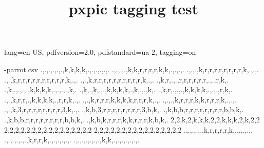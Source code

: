 \DocumentMetadata
  {
    lang=en-US,
    pdfversion=2.0,
    pdfstandard=ua-2,
    tagging=on
  }
\begin{filecontents*}[overwrite]{\jobname-parrot.csv}
.,.,.,.,.,.,k,k,k,k,.,.,.,.,.,.
.,.,.,.,k,k,r,r,r,r,k,k,.,.,.,.
.,.,.,k,r,r,r,r,r,r,r,r,k,.,.,.
.,.,k,r,r,r,r,r,r,r,r,r,r,k,.,.
.,.,k,r,r,r,r,r,r,r,r,r,r,k,.,.
.,k,r,.,.,r,r,r,r,r,r,.,.,r,k,.
.,k,.,.,.,.,k,k,k,k,.,.,.,.,k,.
.,k,.,k,.,.,k,k,k,k,.,k,.,.,k,.
.,k,r,.,.,.,k,k,k,k,.,.,.,r,k,.
.,.,k,r,r,.,k,k,k,k,.,r,r,k,.,.
.,.,k,r,r,r,k,k,k,k,r,r,r,k,.,.
.,.,.,k,r,r,r,k,k,r,r,r,k,.,.,.
.,.,k,3,r,r,r,r,r,r,r,r,3,k,.,.
.,k,b,3,r,r,r,r,r,r,r,r,3,b,k,.
.,k,b,b,r,r,r,r,r,r,r,r,b,b,k,.
.,k,b,b,r,r,r,r,r,r,r,r,b,b,k,.
.,k,b,k,r,r,r,k,k,r,r,r,k,b,k,.
2,2,k,2,k,k,k,2,2,k,k,k,2,k,2,2
2,2,2,2,2,2,2,2,2,2,2,2,2,2,2,2
2,2,2,2,2,2,2,2,2,2,2,2,2,2,2,2
.,.,.,.,.,k,r,r,r,r,k,.,.,.,.,.
.,.,.,.,.,.,k,r,r,k,.,.,.,.,.,.
.,.,.,.,.,.,.,k,k,.,.,.,.,.,.,.
\end{filecontents*}

\documentclass{article}
\usepackage{pxpic}

\title{pxpic tagging test}

\pxpicsetup
  {
    mode = px
    ,colours = {k=black, r=[HTML]{9F393D}, g=green!75!black, b=[rgb]{0,0,1}}
    ,skip = .
    ,size = 10pt
  }



text
\pxpic
  {
    {.k}
    {kkk}
    {.k}
  }



